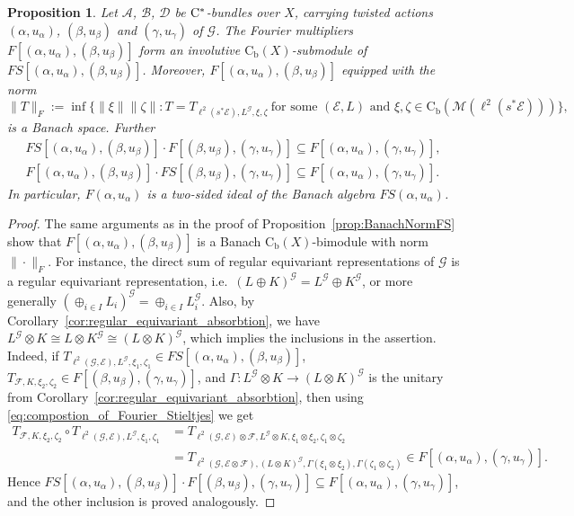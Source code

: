 \documentclass[11 pt, leqno]{amsart}
\numberwithin{equation}{section}
\theoremstyle{plain}
\newtheorem {prop}[thm] {Proposition}
\theoremstyle{definition}
\newcommand*{\contb}{\mathrm{C_b}}%
\newcommand{\B}{\mathcal B}
\newcommand{\M}{\mathcal M}
\newcommand{\G}{\mathcal G} %
\newcommand{\EE}{\mathcal E}
\newcommand{\FF}{\mathcal F}
\newcommand{\A}{\mathcal A}
\newcommand{\D}{\mathcal D}
\newcommand{\cst}{\ifmmode\mathrm{C}^*\else{$\mathrm{C}^*$}\fi}
\begin{document}
\begin{prop}\label{prop:FourierAlgebraProperties}
Let $\A$, $\B$, $\D$  be $\cst$-bundles over $X$, carrying twisted actions $(\alpha,u_\alpha)$, $(\beta,u_\beta)$ and $(\gamma, u_\gamma)$ of $\G$. 
The Fourier multipliers $F[(\alpha,u_{\alpha}),(\beta,u_{\beta})]$ form an involutive $\contb(X)$-submodule of $FS[(\alpha,u_{\alpha}),(\beta,u_{\beta})]$. 
Moreover, $F[(\alpha,u_{\alpha}),(\beta,u_{\beta})]$ equipped with the norm 
\[%
    \| T \|_{F} := \inf \big\{ \|\xi \| \|\zeta \| : T = T_{\ell^2(s^*\EE),L^\G,\xi,\zeta} \ \text{for some $(\EE, L)$ and $\xi,\zeta\in \contb(\M(\ell^2(s^*\EE)))$} \big\},
\]
is a Banach space. %
Further
\begin{gather*}
    FS[(\alpha,u_{\alpha}),(\beta,u_{\beta})]\cdot F[(\beta,u_{\beta}),(\gamma,u_{\gamma})] \subseteq F[(\alpha,u_{\alpha}),(\gamma,u_{\gamma})], \\
    F[(\alpha,u_{\alpha}),(\beta,u_{\beta})] \cdot FS[(\beta,u_{\beta}),(\gamma,u_{\gamma})]\subseteq F[(\alpha,u_{\alpha}),(\gamma,u_{\gamma})] .
\end{gather*}
In particular, $F(\alpha,u_{\alpha})$ is a two-sided ideal of the Banach algebra $FS(\alpha,u_{\alpha})$. 
\end{prop}
\begin{proof} 
The same arguments as in the proof of Proposition~\ref{prop:BanachNormFS} show that $F[(\alpha,u_{\alpha}),(\beta,u_{\beta})]$ is a Banach $\contb(X)$-bimodule with norm $\|\cdot \|_{F}$. 
For instance, the direct sum of regular equivariant representations of $\G$ is a regular equivariant representation, i.e.\ $(L\oplus K)^\G= L^\G\oplus K^\G$, or more generally $(\oplus_{i\in I} L_i)^\G=\oplus_{i\in I} L_i^\G$. 
Also, by Corollary~\ref{cor:regular_equivariant_absorbtion}, we have $L^\G\otimes K\cong L\otimes K^\G \cong (L\otimes K)^\G$, which implies the inclusions in the assertion. 
Indeed, if  $T_{\ell^2(\G , \EE) , L^\G , \xi_1, \zeta_1}\in FS[(\alpha,u_{\alpha}),(\beta,u_{\beta})]$, $T_{\FF , K , \xi_2, \zeta_2}\in F[(\beta,u_{\beta}),(\gamma,u_{\gamma})]$, and 
$\Gamma : L^\G\otimes K \to (L\otimes K)^\G$ is the unitary from  Corollary~\ref{cor:regular_equivariant_absorbtion}, then using \eqref{eq:compostion_of_Fourier_Stieltjes} we get 
\[
\begin{split}
    T_{\FF,K,\xi_2,\zeta_2} \circ  T_{\ell^2(\G , \EE) , L^\G , \xi_1, \zeta_1} &= T_{\ell^2(\G , \EE)\otimes \FF, L^\G\otimes  K,\xi_1\otimes  \xi_2,\zeta_1 \otimes \zeta_2} \\
        &= T_{\ell^2(\G , \EE\otimes \FF), (L\otimes K)^\G , \Gamma(\xi_1\otimes  \xi_2) , \Gamma(\zeta_1\otimes  \zeta_2)} \in F[(\alpha,u_{\alpha}),(\gamma,u_{\gamma})].
\end{split}
\]
Hence $FS[(\alpha,u_{\alpha}),(\beta,u_{\beta})]\cdot F[(\beta,u_{\beta}),(\gamma,u_{\gamma})] \subseteq F[(\alpha,u_{\alpha}),(\gamma,u_{\gamma})]$, and the other inclusion is proved analogously.
\end{proof}
\end{document}
